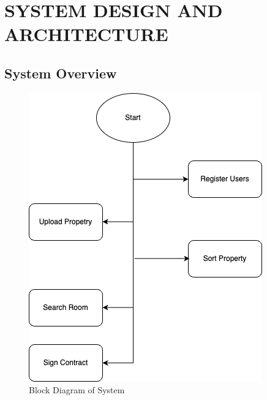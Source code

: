 \section{SYSTEM DESIGN AND ARCHITECTURE}
\subsection{System Overview}
\begin{figure}[h]
    \centering
    \includegraphics{System.png}
    \caption{Block Diagram of System}
    \label{fig:System OVerview}
\end{figure}

\newpage
